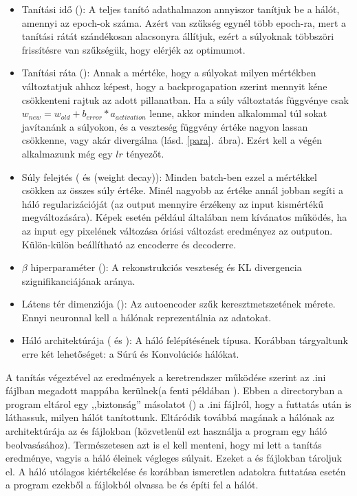 \begin{itemize}
  \item Tanítási idő (): A teljes tanító adathalmazon annyiszor tanítjuk be a hálót, amennyi az epoch-ok száma. Azért van szűkség egynél több epoch-ra, mert a tanítási rátát szándékosan alacsonyra állítjuk, ezért a súlyoknak többszöri frissítésre van szűkségük, hogy elérjék az optimumot.
  \item Tanítási ráta (): Annak a mértéke, hogy a súlyokat milyen mértékben változtatjuk ahhoz képest, hogy a backprogapation szerint mennyit kéne csökkenteni rajtuk az adott pillanatban. Ha a súly változtatás függvénye csak $ w_{new} =  w_{old} + b_{error} * a_{activation}$ lenne, akkor minden alkalommal túl sokat javítanánk a súlyokon, és a veszteség függvény értéke nagyon lassan csökkenne, vagy akár divergálna (lásd. \ref{para}.~ábra). Ezért kell a végén alkalmazunk még egy $lr$ tényezőt.
  \item Súly felejtés ( és  (weight decay)): Minden batch-ben ezzel a mértékkel csökken az összes súly értéke. Minél nagyobb az értéke annál jobban segíti a háló regularizációját (az output mennyire érzékeny az input kismértékű megváltozására). Képek esetén például általában nem kívánatos működés, ha az input egy pixelének változása óriási változást eredményez az outputon. Külön-külön beállítható az encoderre és decoderre.
  \item $\beta$ hiperparaméter  (): A rekonstrukciós veszteség és KL divergencia szignifikanciájának aránya.
  \item Látens tér dimenziója (): Az autoencoder szűk keresztmetszetének mérete. Ennyi neuronnal kell a hálónak reprezentálnia az adatokat.
  \item Háló architektúrája ( és ): A háló felépítésének típusa. Korábban tárgyaltunk erre két lehetőséget: a Súrú és Konvolúciós hálókat.
\end{itemize}

A tanítás végeztével az eredmények a keretrendszer működése szerint az .ini fájlban megadott  mappába kerülnek\newline (a fenti példában ). Ebben a directoryban a program eltárol egy ,,biztonság'' másolatot () a .ini fájlról, hogy a futtatás után is láthassuk, milyen hálót tanítottunk. Eltáródik továbbá magának a hálónak az architektúrája az  és  fájlokban (közvetlenül ezt használja a program egy háló beolvasásához). Természetesen azt is el kell menteni, hogy mi lett a tanítás eredménye, vagyis a háló éleinek végleges súlyait. Ezeket a  és  fájlokban tároljuk el. A háló utólagos kiértékelése és korábban ismeretlen adatokra futtatása esetén a program ezekből a fájlokból olvassa be és építi fel a hálót.

